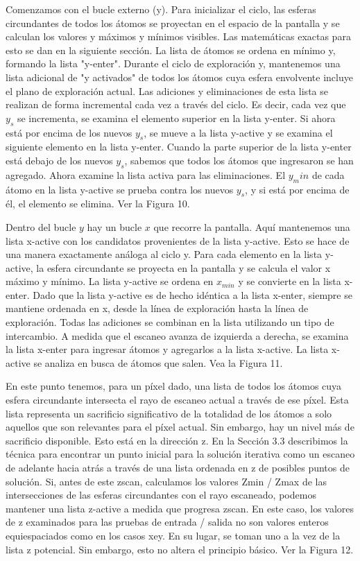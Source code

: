 Comenzamos con el bucle externo (y). Para inicializar el ciclo, las esferas circundantes de todos los átomos se proyectan en el espacio de la pantalla y se calculan los valores y máximos y mínimos visibles. Las matemáticas exactas para esto se dan en la siguiente sección. La lista de átomos se ordena en mínimo y, formando la lista "y-enter". Durante el ciclo de exploración y, mantenemos una lista adicional de "y activados" de todos los átomos cuya esfera envolvente incluye el plano de exploración actual. Las adiciones y eliminaciones de esta lista se realizan de forma incremental cada vez a través del ciclo. Es decir, cada vez que $y_s$ se incrementa, se examina el elemento superior en la lista y-enter. Si ahora está por encima de los nuevos $y_s$, se mueve a la lista y-active y se examina el siguiente elemento en la lista y-enter. Cuando la parte superior de la lista y-enter está debajo de los nuevos $y_s$, sabemos que todos los átomos que ingresaron se han agregado. Ahora examine la lista activa para las eliminaciones. El $y_min$ de cada átomo en la lista y-active se prueba contra los nuevos $y_s$, y si está por encima de él, el elemento se elimina. Ver la Figura 10.

Dentro del bucle $ y $ hay un bucle $ x $ que recorre la pantalla. Aquí mantenemos una lista x-active con los candidatos provenientes de la lista y-active. Esto se hace de una manera exactamente análoga al ciclo y. Para cada elemento en la lista y-active, la esfera circundante se proyecta en la pantalla y se calcula el valor x máximo y mínimo. La lista y-active se ordena en $x_ {min}$ y se convierte en la lista x-enter. Dado que la lista y-active es de hecho idéntica a la lista x-enter, siempre se mantiene ordenada en x, desde la línea de exploración hasta la línea de exploración. Todas las adiciones se combinan en la lista utilizando un tipo de intercambio. A medida que el escaneo avanza de izquierda a derecha, se examina la lista x-enter para ingresar átomos y agregarlos a la lista x-active. La lista x-active se analiza en busca de átomos que salen. Vea la Figura 11.

En este punto tenemos, para un píxel dado, una lista de todos los átomos cuya esfera circundante intersecta el rayo de escaneo actual a través de ese píxel. Esta lista representa un sacrificio significativo de la totalidad de los átomos a solo aquellos que son relevantes para el píxel actual. Sin embargo, hay un nivel más de sacrificio disponible. Esto está en la dirección z. En la Sección 3.3 describimos la técnica para encontrar un punto inicial para la solución iterativa como un escaneo de adelante hacia atrás a través de una lista ordenada en z de posibles puntos de solución. Si, antes de este zscan, calculamos los valores Zmin / Zmax de las intersecciones de las esferas circundantes con el rayo escaneado, podemos mantener una lista z-active a medida que progresa zscan. En este caso, los valores de z examinados para las pruebas de entrada / salida no son valores enteros equiespaciados como en los casos xey. En su lugar, se toman uno a la vez de la lista z potencial. Sin embargo, esto no altera el principio básico. Ver la Figura 12.

